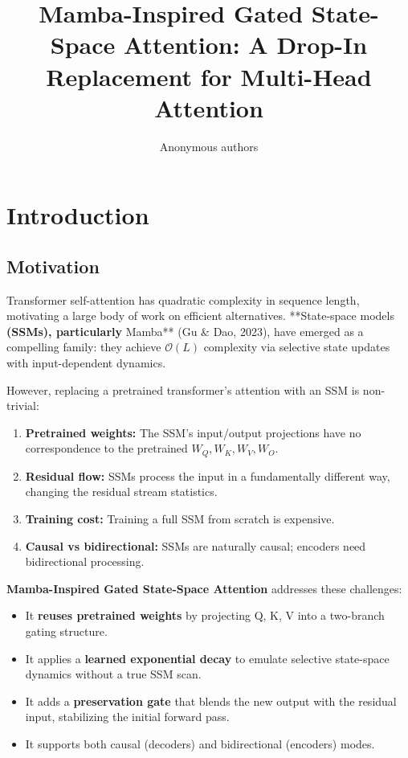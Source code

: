 \title{\textbf{Mamba-Inspired Gated State-Space Attention: A Drop-In Replacement for Multi-Head Attention}}

\author{Anonymous authors}


\section{Introduction}

\subsection{Motivation}

Transformer self-attention has quadratic complexity in sequence length, 
motivating a large body of work on efficient alternatives. **State-space 
models\textbf{ (SSMs), particularly }Mamba** (Gu \& Dao, 2023), have emerged as a 
compelling family: they achieve $\mathcal{O}(L)$ complexity via selective 
state updates with input-dependent dynamics.

However, replacing a pretrained transformer's attention with an SSM is 
non-trivial:

\begin{enumerate}
\item \textbf{Pretrained weights:} The SSM's input/output projections have no
  correspondence to the pretrained $W_Q, W_K, W_V, W_O$.
\item \textbf{Residual flow:} SSMs process the input in a fundamentally different way,
  changing the residual stream statistics.
\item \textbf{Training cost:} Training a full SSM from scratch is expensive.
\item \textbf{Causal vs bidirectional:} SSMs are naturally causal; encoders need
  bidirectional processing.

\end{enumerate}
\textbf{Mamba-Inspired Gated State-Space Attention} addresses these challenges:

\begin{itemize}
\item It \textbf{reuses pretrained weights} by projecting Q, K, V into a two-branch
  gating structure.
\item It applies a \textbf{learned exponential decay} to emulate selective state-space
  dynamics without a true SSM scan.
\item It adds a \textbf{preservation gate} that blends the new output with the residual
  input, stabilizing the initial forward pass.
\item It supports both causal (decoders) and bidirectional (encoders) modes.

\end{itemize}
